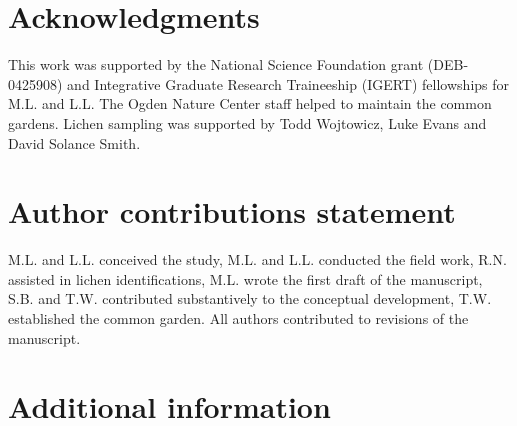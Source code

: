 \documentclass[fleqn,10pt]{wlscirep}
\begin{document}
\section*{Acknowledgments} 

This work was supported by the National Science Foundation grant
(DEB-0425908) and Integrative Graduate Research Traineeship (IGERT)
fellowships for M.L. and L.L. The Ogden Nature Center staff helped to
maintain the common gardens. Lichen sampling was supported by Todd
Wojtowicz, Luke Evans and David Solance Smith.


\section*{Author contributions statement}

M.L. and L.L. conceived the study, M.L. and L.L. conducted the field
work, R.N.  assisted in lichen identifications, M.L. wrote the first
draft of the manuscript, S.B. and T.W. contributed substantively to
the conceptual development, T.W. established the common garden. All
authors contributed to revisions of the manuscript.

\section*{Additional information}




\clearpage
\newpage


\end{document}
